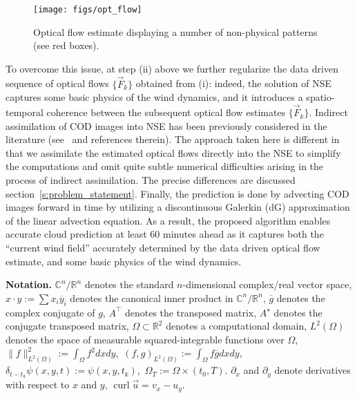 \documentclass[onecolumn, 12pt, conference]{ieeeconf}
\newcommand{\R}{\mathbb{R}}
\def\F{\vec{F}}
\newcommand{\Lt}{L^2(\Omega)}
\renewcommand{\u}{\vec{u}}
\newcommand{\curl}{\operatorname{curl}}
\begin{document}
\begin{figure}[h]
\centering
  \texttt{[image: figs/opt\_flow]}
  \caption{Optical flow estimate displaying a number of non-physical patterns (see red boxes).}
\label{fig:patches}
\end{figure}

To overcome this issue, at step (ii) above we further regularize the data driven sequence of optical flows $\{\F_k\}$ obtained from (i): indeed, the solution of NSE captures some basic physics of the wind dynamics, and it introduces a spatio-temporal coherence between the subsequent optical flow estimates $\{\F_k\}$. Indirect assimilation of COD images into NSE has been previously considered in the literature (see~\cite{na11,HerlinBMZ12} and references therein). The approach taken here is different in that we assimilate the estimated optical flows directly into the NSE to simplify the computations and omit quite subtle numerical difficulties arising in the process of indirect assimilation. The precise differences are discussed section~\ref{s:problem_statement}. Finally, the prediction is done by advecting COD images forward in time by utilizing a discontinuous Galerkin (dG) approximation of the linear advection equation. As a result, the proposed algorithm enables accurate cloud  prediction at least 60 minutes ahead as it captures both the ``current wind field'' accurately determined by the data driven optical flow estimate, and some basic physics of the wind dynamics.

\textbf{Notation.} $\mathbb{C}^n/\mathbb{R}^n$ denotes the standard $n$-dimensional complex/real vector space, $x\cdot y:=\sum x_i\overline{y}_i$ denotes the canonical inner product in $\mathbb{C}^n/\mathbb{R}^n$, $\overline{g}$ denotes the complex conjugate of $g$, $A^\top$ denotes the transposed matrix, $A^\star$ denotes the conjugate transposed matrix, $\Omega\subset\R^2$ denotes a computational domain, $\Lt$ denotes the space of measurable squared-integrable functions over $\Omega$,\, $\|f\|^2_{\Lt}:=\int_\Omega f^2 dxdy$,\, $(f,g)_{\Lt}:=\int_\Omega f\overline{g} dxdy$,\, $\delta_{t-t_k}\psi(x,y,t):=\psi(x,y,t_k)$,\, $\Omega_T:=\Omega\times(t_0,T)$. $\partial_x$ and $\partial_y$ denote derivatives with respect to $x$ and $y$, $\curl\u=v_x-u_y$.
\end{document}
